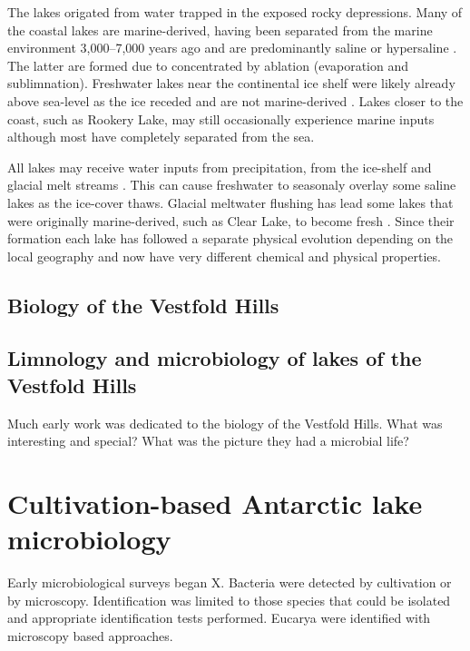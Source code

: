 \documentclass{book}
\begin{document}
The lakes origated from water trapped in the exposed rocky depressions.
Many of the coastal lakes are marine-derived, having been separated from the marine environment 3,000--7,000 years ago \cite{Gibson1999} and are predominantly saline or hypersaline \cite{Burke1988}.
The latter are formed due to concentrated by ablation (evaporation and sublimnation). %
Freshwater lakes near the continental ice shelf were likely already above sea-level as the ice receded and are not marine-derived \cite{Laybourne-Parry1992} \cite{Bronge1996}.
Lakes closer to the coast, such as Rookery Lake, may still occasionally experience marine inputs although most have completely separated from the sea. %

All lakes may receive water inputs from precipitation, from the ice-shelf and glacial melt streams \cite{Burton1981}. 
This can cause freshwater to seasonaly overlay some saline lakes as the ice-cover thaws.
Glacial meltwater flushing has lead some lakes that were originally marine-derived, such as Clear Lake, to become fresh \cite{Pickard1986}\cite{Bird1991}.
Since their formation each lake has followed a separate physical evolution depending on the local geography and now have very different chemical and physical properties. 

\subsection{Biology of the Vestfold Hills}

\subsection{Limnology and microbiology of lakes of the Vestfold Hills}

Much early work was dedicated to the biology of the Vestfold Hills.
What was interesting and special?
What was the picture they had a microbial life?

\section{Cultivation-based Antarctic lake microbiology}

Early microbiological surveys began X.
Bacteria were detected by cultivation or by microscopy. 
Identification was limited to those species that could be isolated and appropriate identification tests performed.
Eucarya were identified with microscopy based approaches.
\end{document}
